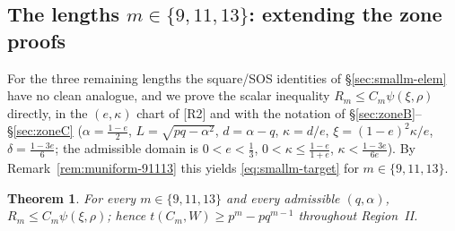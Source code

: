 \documentclass[11pt]{article}
\newtheorem{theorem}{Theorem}[section]
\theoremstyle{remark}
\theoremstyle{plain}
\theoremstyle{plain}
\begin{document}
\subsection{The lengths \texorpdfstring{$m\in\{9,11,13\}$}{m in 9,11,13}: extending the zone proofs}\label{sec:smallm-91113}

For the three remaining lengths the square/SOS identities of
\S\ref{sec:smallm-elem} have no clean analogue, and we prove the scalar
inequality $R_m\le C_m\psi(\xi,\rho)$ directly, in the $(e,\kappa)$ chart of
[R2] and with the notation of \S\ref{sec:zoneB}--\S\ref{sec:zoneC}
($\alpha=\tfrac{1-e}2$, $L=\sqrt{pq-\alpha^2}$, $d=\alpha-q$, $\kappa=d/e$,
$\xi=(1-e)^2\kappa/e$, $\delta=\tfrac{1-3e}6$; the admissible domain is
$0<e<\tfrac13$, $0<\kappa\le\tfrac{1-e}{1+e}$, $\kappa<\tfrac{1-3e}{6e}$).  By
Remark~\ref{rem:muniform-91113} this yields \eqref{eq:smallm-target} for
$m\in\{9,11,13\}$.

\begin{theorem}\label{thm:smallm-91113}
For every $m\in\{9,11,13\}$ and every admissible $(q,\alpha)$,
$R_m\le C_m\psi(\xi,\rho)$; hence $t(C_m,W)\ge p^m-pq^{m-1}$ throughout Region~II.
\end{theorem}
\end{document}
